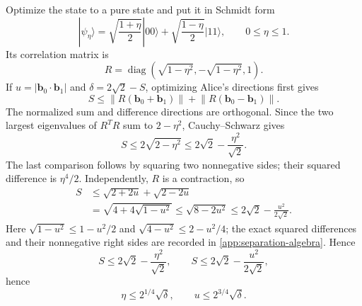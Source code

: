 \documentclass[11pt]{article}
\theoremstyle{definition}
\begin{document}
Optimize the state to a pure state and put it in Schmidt form
\[
|\psi_\eta\rangle=
\sqrt{\frac{1+\eta}{2}}|00\rangle+
\sqrt{\frac{1-\eta}{2}}|11\rangle,\qquad0\le\eta\le1.
\]
Its correlation matrix is
\[
R=\operatorname{diag}(\sqrt{1-\eta^2},-\sqrt{1-\eta^2},1).
\]
If \(u=|\bm b_0\cdot\bm b_1|\) and
\(\delta=2\sqrt2-S\), optimizing Alice's directions first gives
\[
S\le
\lVert R(\bm b_0+\bm b_1)\rVert+
\lVert R(\bm b_0-\bm b_1)\rVert.
\]
The normalized sum and difference directions are orthogonal. Since the two
largest eigenvalues of \(R^TR\) sum to \(2-\eta^2\), Cauchy--Schwarz gives
\[
S\le2\sqrt{2-\eta^2}
\le2\sqrt2-\frac{\eta^2}{\sqrt2}.
\]
The last comparison follows by squaring two nonnegative sides; their squared
difference is \(\eta^4/2\). Independently, \(R\) is a contraction, so
\[
\begin{aligned}
S&\le\sqrt{2+2u}+\sqrt{2-2u}\\
&=\sqrt{4+4\sqrt{1-u^2}}
\le\sqrt{8-2u^2}
\le2\sqrt2-\frac{u^2}{2\sqrt2}.
\end{aligned}
\]
Here \(\sqrt{1-u^2}\le1-u^2/2\) and
\(\sqrt{4-u^2}\le2-u^2/4\); the exact squared differences and their
nonnegative right sides are recorded in
\cref{app:separation-algebra}. Hence
\begin{equation}
\label{eq:deficit-bounds}
S\le2\sqrt2-\frac{\eta^2}{\sqrt2},\qquad
S\le2\sqrt2-\frac{u^2}{2\sqrt2},
\end{equation}
hence
\[
\eta\le2^{1/4}\sqrt\delta,\qquad
u\le2^{3/4}\sqrt\delta.
\]
\end{document}
